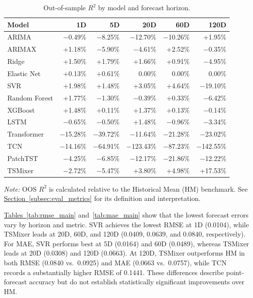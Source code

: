 \documentclass[runningheads,orivec]{llncs}
\begin{document}
\begin{table}[htbp]
\centering
\caption{Out-of-sample $R^2$ by model and forecast horizon.}\label{tab:oos_r2_main}
\setlength{\tabcolsep}{4.5pt}
\begin{tabular}{lrrrrr}
\hline
Model & 1D & 5D & 20D & 60D & 120D \\
\hline
ARIMA & $-$0.49\% & $-$8.25\% & $-$12.70\% & $-$10.26\% & +1.95\% \\
ARIMAX & +1.18\% & $-$5.90\% & $-$4.61\% & +2.52\% & $-$0.35\% \\
Ridge & +1.50\% & +1.79\% & +1.66\% & +0.91\% & $-$4.95\% \\
Elastic Net & +0.13\% & +0.61\% & 0.00\% & 0.00\% & 0.00\% \\
SVR & +1.98\% & +1.48\% & +3.05\% & +4.64\% & $-$19.10\% \\
Random Forest & +1.77\% & $-$1.30\% & $-$0.39\% & +0.33\% & $-$6.42\% \\
XGBoost & +1.48\% & +0.11\% & +1.37\% & +0.13\% & $-$0.14\% \\
LSTM & $-$0.65\% & $-$0.50\% & +1.48\% & $-$0.96\% & $-$3.34\% \\
Transformer & $-$15.28\% & $-$39.72\% & $-$11.64\% & $-$21.28\% & $-$23.02\% \\
TCN & $-$14.16\% & $-$64.91\% & $-$123.43\% & $-$87.23\% & $-$142.55\% \\
PatchTST & $-$4.25\% & $-$6.85\% & $-$12.17\% & $-$21.86\% & $-$12.22\% \\
TSMixer & $-$2.72\% & $-$5.47\% & +3.80\% & +4.98\% & +17.53\% \\
\hline
\end{tabular}
\par\vspace{4pt}\parbox{0.85\linewidth}{\footnotesize\textit{Note:} OOS $R^2$ is calculated relative to the Historical Mean (HM) benchmark. See \hyperref[subsec:eval_metrics]{Section~\ref*{subsec:eval_metrics}} for its definition and interpretation.}
\end{table}

\hyperref[tab:rmse_main]{Tables~\ref*{tab:rmse_main}} and~\hyperref[tab:mae_main]{\ref*{tab:mae_main}} show that the lowest forecast errors vary by horizon and metric. SVR achieves the lowest RMSE at 1D (0.0104), while TSMixer leads at 20D, 60D, and 120D (0.0409, 0.0639, and 0.0840, respectively). For MAE, SVR performs best at 5D (0.0164) and 60D (0.0489), whereas TSMixer leads at 20D (0.0308) and 120D (0.0663). At 120D, TSMixer outperforms HM in both RMSE (0.0840 vs.\ 0.0925) and MAE (0.0663 vs.\ 0.0757), while TCN records a substantially higher RMSE of 0.1441. These differences describe point-forecast accuracy but do not establish statistically significant improvements over HM.
\end{document}
